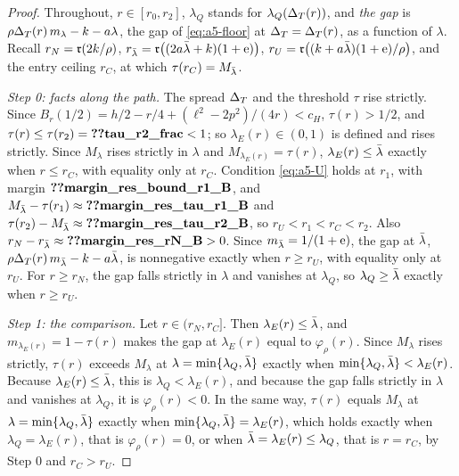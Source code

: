 \begin{proof}
Throughout, \(r\in[r_0,r_2]\), \(\lambda_Q\) stands for \(\lambda_Q(\Delta_T(r))\), and \emph{the gap} is
\(\rho\Delta_T(r)\,m_\lambda-k-a\lambda\), the gap of \eqref{eq:a5-floor} at \(\Delta_T=\Delta_T(r)\), as a function of \(\lambda\).
Recall \(r_N=\mathfrak{r}(2k/\rho)\), \(r_{\bar\lambda}=\mathfrak{r}\bigl((2a\bar\lambda+k)(1+\mathrm{e})\bigr)\),
\(r_U=\mathfrak{r}\bigl((k+a\bar\lambda)(1+\mathrm{e})/\rho\bigr)\), and the entry ceiling \(r_C\), at which \(\tau(r_C)=M_{\bar\lambda}\).

\emph{Step 0: facts along the path.} The spread \(\Delta_T\) and the threshold \(\tau\) rise strictly. Since
\(B_r(1/2)=h/2-r/4+(\ell^2-2p^2)/(4r)<c_H\), \(\tau(r)>1/2\), and \(\tau(r)\le\tau(r_2)=\reg{tau_r2_frac}<1\); so \(\lambda_E(r)\in(0,1)\)
is defined and rises strictly. Since \(M_\lambda\) rises strictly in \(\lambda\) and \(M_{\lambda_E(r)}=\tau(r)\),
\(\lambda_E(r)\le\bar\lambda\) exactly when \(r\le r_C\), with equality only at \(r_C\). Condition \eqref{eq:a5-U} holds at
\(r_1\), with margin \(\reg{margin_res_bound_r1_B}\), and \(M_{\lb}-\tau(r_1)\approx\reg{margin_res_tau_r1_B}\) and
\(\tau(r_2)-M_{\lb}\approx\reg{margin_res_tau_r2_B}\), so \(r_U<r_1<r_C<r_2\). Also \(r_N-r_{\lb}\approx\reg{margin_res_rN_B}>0\).
Since \(m_{\bar\lambda}=1/(1+\mathrm{e})\), the gap at \(\bar\lambda\), \(\rho\Delta_T(r)\,m_{\bar\lambda}-k-a\bar\lambda\), is nonnegative exactly when
\(r\ge r_U\), with equality only at \(r_U\). For \(r\ge r_N\), the gap falls strictly in \(\lambda\) and vanishes at
\(\lambda_Q\), so \(\lambda_Q\ge\bar\lambda\) exactly when \(r\ge r_U\).

\emph{Step 1: the comparison.} Let \(r\in(r_N,r_C]\). Then \(\lambda_E(r)\le\bar\lambda\), and \(m_{\lambda_E(r)}=1-\tau(r)\)
makes the gap at \(\lambda_E(r)\) equal to \(\varphi_\rho(r)\). Since \(M_\lambda\) rises strictly, \(\tau(r)\)
exceeds \(M_\lambda\) at \(\lambda=\min\{\lambda_Q,\bar\lambda\}\) exactly when \(\min\{\lambda_Q,\bar\lambda\}<\lambda_E(r)\). Because
\(\lambda_E(r)\le\bar\lambda\), this is \(\lambda_Q<\lambda_E(r)\), and because the gap falls strictly in \(\lambda\) and
vanishes at \(\lambda_Q\), it is \(\varphi_\rho(r)<0\). In the same way, \(\tau(r)\) equals \(M_\lambda\) at
\(\lambda=\min\{\lambda_Q,\bar\lambda\}\) exactly when \(\min\{\lambda_Q,\bar\lambda\}=\lambda_E(r)\), which holds exactly when
\(\lambda_Q=\lambda_E(r)\), that is \(\varphi_\rho(r)=0\), or when \(\bar\lambda=\lambda_E(r)\le\lambda_Q\), that is \(r=r_C\),
by Step 0 and \(r_C>r_U\).


\end{proof}

